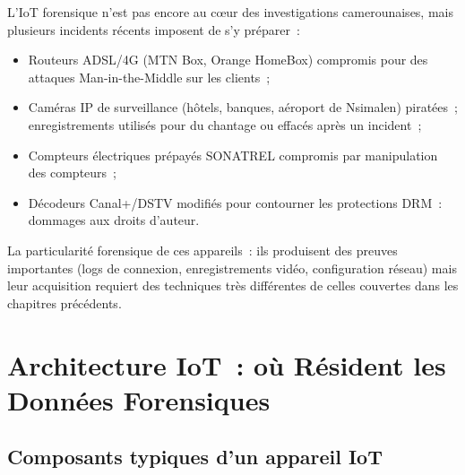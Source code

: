 L'IoT forensique n'est pas encore au c\oe ur des investigations camerounaises,
mais plusieurs incidents récents imposent de s'y préparer~:

\begin{itemize}
    \item Routeurs ADSL/4G (MTN Box, Orange HomeBox) compromis pour
          des attaques Man-in-the-Middle sur les clients~;
    \item Caméras IP de surveillance (hôtels, banques, aéroport
          de Nsimalen) piratées~; enregistrements utilisés pour
          du chantage ou effacés après un incident~;
    \item Compteurs électriques prépayés SONATREL compromis
          par manipulation des compteurs~;
    \item Décodeurs Canal+/DSTV modifiés pour contourner les
          protections DRM~: dommages aux droits d'auteur.
\end{itemize}

La particularité forensique de ces appareils~: ils produisent des
preuves importantes (logs de connexion, enregistrements vidéo,
configuration réseau) mais leur acquisition requiert des techniques
très différentes de celles couvertes dans les chapitres précédents.

\separateur

\section{Architecture IoT~: où Résident les Données Forensiques}
\label{sec:architecture-iot}

\subsection{Composants typiques d'un appareil IoT}

